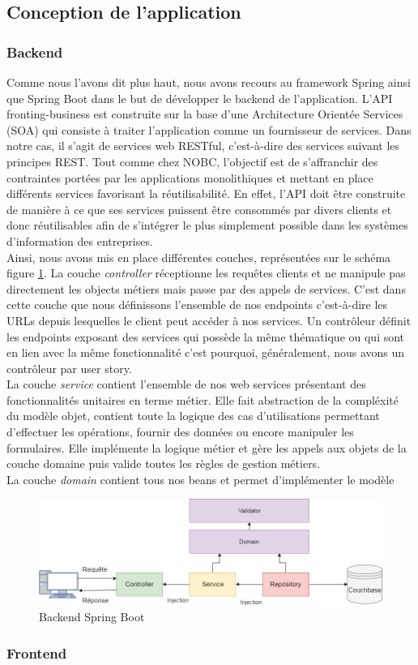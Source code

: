 \subsection{Conception de l'application}

\subsubsection{Backend}

	Comme nous l'avons dit plus haut, nous avons recours au framework Spring ainsi que Spring Boot dans le but de développer le backend de l'application. L'API fronting-business est construite sur la base d'une Architecture Orientée Services (SOA) qui consiste à traiter l'application comme un fournisseur de services. Dans notre cas, il s'agit de services web RESTful, c'est-à-dire des services suivant les principes REST. Tout comme chez NOBC, l'objectif est de s'affranchir des contraintes portées par les applications monolithiques et mettant en place différents services favorisant la réutilisabilité. En effet, l'API doit être construite de manière à ce que ses services puissent être consommés par divers clients et donc réutilisables afin de s'intégrer le plus simplement possible dans les systèmes d'information des entreprises. \\

	Ainsi, nous avons mis en place différentes couches, représentées sur le schéma figure \ref{spring}. La couche \textit{controller} réceptionne les requêtes clients et ne manipule pas directement les objects métiers mais passe par des appels de services. C'est dans cette couche que nous définissons l'ensemble de nos endpoints c'est-à-dire les URLs depuis lesquelles le client peut accéder à nos services. Un contrôleur définit les endpoints exposant des services qui possède la même thématique ou qui sont en lien avec la même fonctionnalité c'est pourquoi, généralement, nous avons un contrôleur par user story. \\
	
	La couche \textit{service} contient l'ensemble de nos web services présentant des fonctionnalités unitaires en terme métier. Elle fait abstraction de la compléxité du modèle objet, contient toute la logique des cas d'utilisations permettant d'effectuer les opérations, fournir des données ou encore manipuler les formulaires. Elle implémente la logique métier et gère les appels aux objets de la couche domaine puis valide toutes les règles de gestion métiers. \\
	
	La couche \textit{domain} contient tous nos beans et permet d'implémenter le modèle
	
	
\begin{figure}[h!]
	\includegraphics[scale=0.50]{images/travailBP1818/architecture/spring.png}
	\centering
	\caption{Backend Spring Boot}
	\label{spring}
\end{figure}

\subsubsection{Frontend}